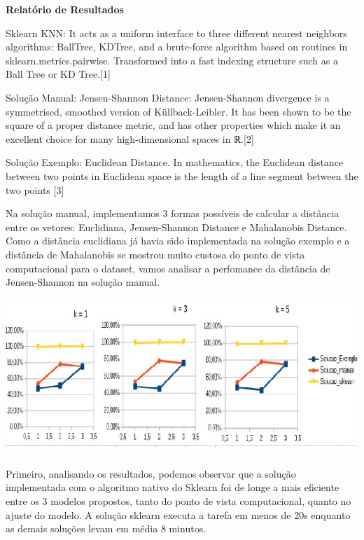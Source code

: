 \documentclass{article}
\date{\today}
\begin{document}
\textbf{Relatório de Resultados}
\vspace{2.0cm}


Sklearn KNN:  It acts as a uniform interface to three different nearest neighbors algorithms: BallTree, KDTree, and a brute-force algorithm based on routines in sklearn.metrics.pairwise. Transformed into a fast indexing structure such as a Ball Tree or KD Tree.[1]

\vspace{1.0cm}


Solução Manual: Jensen-Shannon Distance: Jensen-Shannon divergence is a symmetrised, smoothed version of Küllback-Leibler. It has been shown to be the square of a proper distance metric, and has other properties which make it an excellent choice for many high-dimensional spaces in ℝ.[2]

\vspace{1.0cm}


Solução Exemplo: Euclidean Distance. In mathematics, the Euclidean distance between two points in Euclidean space is the length of a line segment between the two points [3]


\vspace{1.0cm}


Na solução manual, implementamos 3 formas possíveis de calcular a distância entre os vetores: Euclidiana, Jensen-Shannon Distance e Mahalanobis Distance. Como a distância euclidiana já havia sido implementada na solução exemplo e a distância de Mahalanobis se mostrou muito custosa do ponto de vista computacional para o dataset, vamos analisar a perfomance da distância de Jensen-Shannon na solução manual. 


\includegraphics{figure 2}

\vspace{1.0cm}


Primeiro, analisando os resultados, podemos observar que a solução implementada com o algoritmo nativo do Sklearn foi de longe a mais eficiente entre os 3 modelos propostos, tanto do ponto de vista computacional, quanto no ajuste do modelo. A solução sklearn executa a tarefa em menos de 20s enquanto as demais soluções levam em média 8 minutos.
\end{document}
